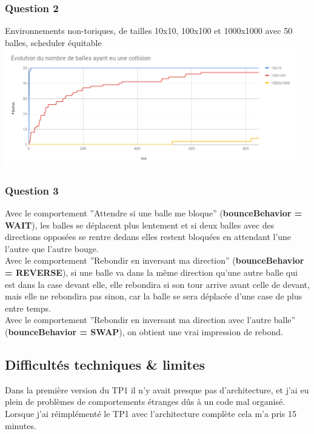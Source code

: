 \documentclass[11pt,a4paper,oneside]{report}
\begin{document}
\subsubsection*{Question 2}
\begin{center}
Environnements non-toriques, de tailles 10x10, 100x100 et 1000x1000 avec 50 balles, scheduler équitable
\includegraphics[width=480px]{particles_collisions}
\end{center}

\newpage

\subsubsection*{Question 3}
Avec le comportement ''Attendre si une balle me bloque'' (\textbf{bounceBehavior = WAIT}), les balles se déplacent plus lentement et si deux balles avec des directions opposées se rentre dedans elles restent bloquées en attendant l'une l'autre que l'autre bouge.\\
Avec le comportement ''Rebondir en inversant ma direction'' (\textbf{bounceBehavior = REVERSE}), si une balle va dans la même direction qu'une autre balle qui est dans la case devant elle, elle rebondira si son tour arrive avant celle de devant, mais elle ne rebondira pas sinon, car la balle se sera déplacée d'une case de plus entre temps.\\
Avec le comportement ''Rebondir en inversant ma direction avec l'autre balle'' (\textbf{bounceBehavior = SWAP}), on obtient une vrai impression de rebond.

\subsection*{Difficultés techniques \& limites}
Dans la première version du TP1 il n'y avait presque pas d'architecture, et j'ai eu plein de problèmes de comportements étranges dûs à un code mal organisé. Lorsque j'ai réimplémenté le TP1 avec l'architecture complète cela m'a pris 15 minutes.
\end{document}
